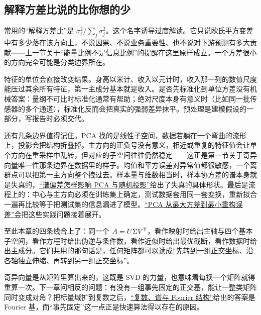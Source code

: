 \subsection{解释方差比说的比你想的少}

常用的``解释方差比''是 \(\sigma_i^2/\sum_j\sigma_j^2\)。这个名字诱导过度解读。它只说欧氏平方变差中有多少落在该方向上，不说因果、不说业务重要性、也不说对下游预测有多大贡献——上一节关于``能量比例不是信息比例''的提醒在这里原样成立。一个方差很小的方向完全可能是分类边界所在。

特征的单位会直接改变结果。身高以米计、收入以元计时，收入那一列的数值尺度能压过其余所有特征，第一主成分基本就是收入。是否先标准化到单位方差没有机械答案：量纲不可比时标准化通常有帮助；绝对尺度本身有意义时（比如同一批传感器的多个通道），标准化反而会把真实的强弱差异抹平。预处理是建模假设的一部分，写报告时必须交代。

还有几条边界值得记住。PCA 找的是线性子空间，数据若躺在一个弯曲的流形上，投影会把结构折叠掉。主方向的正负号没有意义，相近或重复的特征值会让单个方向在重采样中乱转，但对应的子空间往往仍然稳定——这正是第一节关于奇异向量唯一性那条边界在数据里的样子。均值和平方误差对异常值都很敏感，一个离群点可以把第一主方向整个拽过去。样本量与维数相当时，样本协方差的谱本身就是失真的，\hyperref[sec:11-Mathematical-Statistics/09-Random-Matrix-Theory/03]{``谱偏差怎样影响 PCA 与随机投影''}给出了失真的具体形状。最后是流程上的：中心与主方向必须在训练集上确定，测试数据套用同一套变换，重新拟合一遍再比较等于把测试集的信息漏进了模型。\hyperref[sec:13-Machine-Learning/04-Dimensionality-Reduction/01]{``PCA 从最大方差到最小重构误差''}会把这些实践问题接着展开。

至此本章的四条线合上了：同一个 \(A=U\Sigma V^{\mathsf{T}}\)，看作映射时给出主轴与四个基本子空间，看作方程时给出伪逆与条件数，看作近似时给出最优截断，看作数据时给出主成分。它们共用的那句话是，任何矩阵都可以读成``先转到一组正交坐标、沿各轴独立伸缩、再转到另一组正交坐标''。

奇异向量是从矩阵里算出来的，这既是 SVD 的力量，也意味着每换一个矩阵就得重算一次。下一章问相反的问题：有没有一组事先固定的正交基，能让一整类矩阵同时变成对角？把标量域扩到复数之后，\hyperref[ch:023]{``复数、谱与 Fourier 结构''}给出的答案是 Fourier 基，而``事先固定''这一点正是快速算法得以存在的原因。
